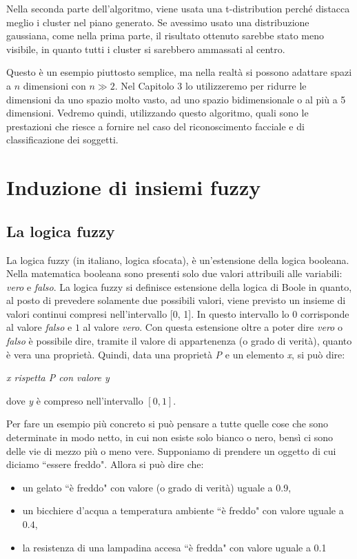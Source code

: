 \documentclass[12pt,italian]{report}
\begin{document}
Nella seconda parte dell'algoritmo, viene usata una t-distribution perché distacca meglio i cluster nel piano generato. Se avessimo usato una distribuzione gaussiana, come nella prima parte, il risultato ottenuto sarebbe stato meno visibile, in quanto tutti i cluster si sarebbero ammassati al centro.

Questo è un esempio piuttosto semplice, ma nella realtà si possono adattare spazi a $n$ dimensioni con $ n \gg 2 $. Nel Capitolo 3 lo utilizzeremo per ridurre le dimensioni da uno spazio molto vasto, ad uno spazio bidimensionale o al più a 5 dimensioni. Vedremo quindi, utilizzando questo algoritmo, quali sono le prestazioni che riesce a fornire nel caso del riconoscimento facciale e di classificazione dei soggetti.
% 
% 


\chapter{Induzione di insiemi fuzzy}
\label{ch:prova}

\section{La logica fuzzy}
La logica fuzzy (in italiano, logica sfocata), è un'estensione della logica booleana. Nella matematica booleana sono presenti solo due valori attribuili alle variabili: \emph{vero} e \emph{falso}. 
La logica fuzzy si definisce estensione della logica di Boole in quanto, al posto di prevedere solamente due possibili valori, viene previsto un insieme di valori continui compresi nell'intervallo [0, 1]. In questo intervallo lo $0$ corrisponde al valore \emph{falso} e $1$ al valore \emph{vero}. Con questa estensione oltre a poter dire \emph{vero} o \emph{falso} è possibile dire, tramite il valore di appartenenza (o grado di verità), quanto è vera una proprietà.
Quindi, data una proprietà \emph{P} e un elemento \emph{x}, si può dire:

\begin{center}
	\centering
	{

		\em{x rispetta P con valore y}
		
	}
\end{center} 
dove \emph{y} è compreso nell'intervallo $ [0,1] $.

Per fare un esempio più concreto si può pensare a tutte quelle cose che sono determinate in modo netto, in cui non esiste solo bianco o nero, bensì ci sono delle vie di mezzo più o meno vere.
Supponiamo di prendere un oggetto di cui diciamo ``essere freddo". Allora si può dire che:
\begin{itemize}
	\item un gelato ``è freddo" con valore (o grado di verità) uguale a 0.9,
	\item un bicchiere d'acqua a temperatura ambiente ``è freddo" con valore uguale a $ 0.4 $,
	\item la resistenza di una lampadina accesa ``è fredda" con valore uguale a 0.1
\end{itemize}
\end{document}
